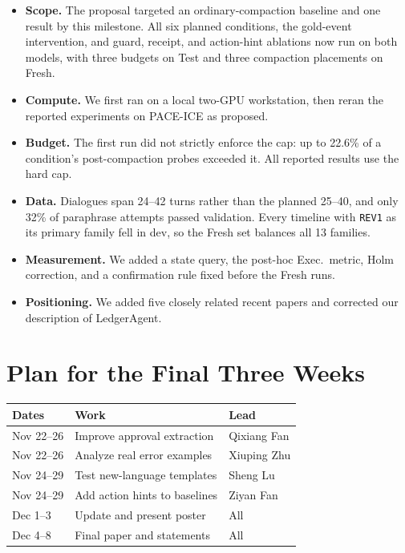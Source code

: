 \documentclass[11pt]{article}
\newcommand{\st}[1]{\texttt{#1}}
\begin{document}
\begin{itemize}\setlength{\itemsep}{1pt}\setlength{\parskip}{0pt}\setlength{\topsep}{2pt}
\item \textbf{Scope.} The proposal targeted an ordinary-compaction baseline and one result by this milestone. All six planned conditions, the gold-event intervention, and guard, receipt, and action-hint ablations now run on both models, with three budgets on Test and three compaction placements on Fresh.
\item \textbf{Compute.} We first ran on a local two-GPU workstation, then reran the reported experiments on PACE-ICE as proposed.
\item \textbf{Budget.} The first run did not strictly enforce the cap: up to 22.6\% of a condition's post-compaction probes exceeded it. All reported results use the hard cap.
\item \textbf{Data.} Dialogues span 24--42 turns rather than the planned 25--40, and only 32\% of paraphrase attempts passed validation. Every timeline with \st{REV1} as its primary family fell in dev, so the Fresh set balances all 13 families.
\item \textbf{Measurement.} We added a state query, the post-hoc Exec.\ metric, Holm correction, and a confirmation rule fixed before the Fresh runs.
\item \textbf{Positioning.} We added five closely related recent papers and corrected our description of LedgerAgent.
\end{itemize}

\section{Plan for the Final Three Weeks}

\begin{center}\small\setlength{\tabcolsep}{3pt}
\begin{tabular}{@{}l>{\raggedright\arraybackslash}p{}>{\raggedright\arraybackslash}p{}@{}}
\toprule
Dates & Work & Lead \\
\midrule
Nov 22--26 & Improve approval extraction & Qixiang Fan \\
Nov 22--26 & Analyze real error examples & Xiuping Zhu \\
Nov 24--29 & Test new-language templates & Sheng Lu \\
Nov 24--29 & Add action hints to baselines & Ziyan Fan \\
Dec 1--3 & Update and present poster & All \\
Dec 4--8 & Final paper and statements & All \\
\bottomrule
\end{tabular}
\end{center}
\end{document}

